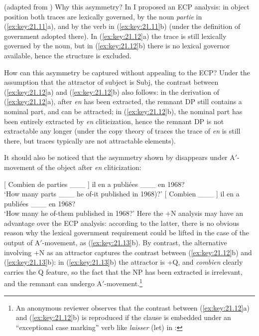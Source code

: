 \documentclass[output=paper]{langsci/langscibook}
\begin{document}
\begin{exe}
\ea%
    \label{ex:key:21.12} (adapted from \citealt{Ruwet1972})
    \z
\z
%
Why this asymmetry? In \citet[37--38]{Rizzi1990} I proposed an \gls{ECP}
analysis: in object position both traces are lexically governed, by the noun
\emph{partie} in (\ref{ex:key:21.11}a), and by the verb in (\ref{ex:key:21.11}b)
(under the definition of government adopted there). In (\ref{ex:key:21.12}a) the
trace is still lexically governed by the noun, but in (\ref{ex:key:21.12}b) there
is no lexical governor available, hence the structure is excluded.

How can this asymmetry be captured without appealing to the ECP? Under the
assumption that the attractor of subject is Subj\tss{[$+$N]}, the contrast
between (\ref{ex:key:21.12}a) and (\ref{ex:key:21.12}b) also follows: in the
derivation of (\ref{ex:key:21.12}a), after \emph{en} has been extracted, the
remnant DP still contains a nominal part, and can be attracted; in
(\ref{ex:key:21.12}b), the nominal part has been entirely extracted by
\emph{en} cliticization, hence the remnant DP is not extractable any longer
(under the copy theory of traces the trace of \emph{en} is still there, but
traces typically are not attractable elements).

It should also be noticed that the asymmetry shown by 
disappears under A$'$-movement of the object after \emph{en} cliticization:

\ea%
    \label{ex:key:21.13}
    \ea {}[ Combien de parties \_\_\_ ] il en a publiées \_\_\_ en 1968?\\
        ‘How many parts \_\_\_  he of-it published in 1968)?’
    \ex {}[ Combien \_\_\_ ]  il en a publiées \_\_\_ en 1968?\\
            ‘How many        he of-them published in 1968?’
    \z
\z\largerpage[-5]
%
Here the $+$N analysis may have an advantage over the \gls{ECP} analysis:
according to the latter, there is no obvious reason why the lexical government
requirement could be lifted in the case of the output of A$'$-movement, as
(\ref{ex:key:21.13}b). By contrast, the alternative involving $+$N as an attractor
captures the contrast between (\ref{ex:key:21.12}b) and (\ref{ex:key:21.13}b): in
(\ref{ex:key:21.13}b) the attractor is +Q, and \emph{combien} clearly carries the
Q feature, so the fact that the NP has been extracted is irrelevant, and the
remnant can undergo A$'$-movement.\footnote{An anonymous reviewer observes that
    the contrast between (\ref{ex:key:21.12}a) and (\ref{ex:key:21.12}b) is
    reproduced if the clause is embedded under an “exceptional case marking”
    verb like \emph{laisser} (let) in :

}
\end{exe}
\end{document}
